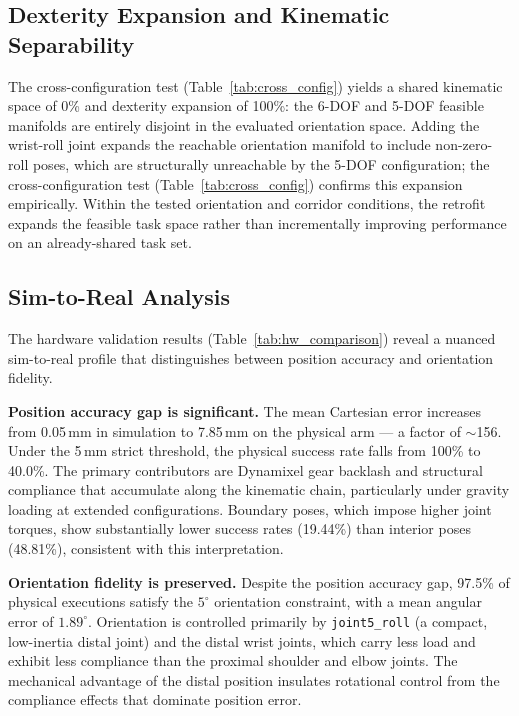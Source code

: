 \documentclass[conference]{IEEEtran}
\begin{document}
	\subsection{Dexterity Expansion and Kinematic Separability}
	
	The cross-configuration test (Table~\ref{tab:cross_config}) yields a
	shared kinematic space of 0\% and dexterity expansion of 100\%: the
	6-DOF and 5-DOF feasible manifolds are entirely disjoint in the
	evaluated orientation space. Adding the wrist-roll joint expands the
	reachable orientation manifold to include non-zero-roll poses, which
	are structurally unreachable by the 5-DOF configuration; the
	cross-configuration test (Table~\ref{tab:cross_config}) confirms this
	expansion empirically. Within the tested orientation and corridor
	conditions, the retrofit expands the feasible task space rather than
	incrementally improving performance on an already-shared task set.
	
	\subsection{Sim-to-Real Analysis}
	\label{sec:sim_to_real}
	
	The hardware validation results (Table~\ref{tab:hw_comparison}) reveal
	a nuanced sim-to-real profile that distinguishes between position
	accuracy and orientation fidelity.
	
	\textbf{Position accuracy gap is significant.}
	The mean Cartesian error increases from 0.05\,mm in simulation to
	7.85\,mm on the physical arm --- a factor of $\sim$156. Under the
	5\,mm strict threshold, the physical success rate falls from 100\% to
	40.0\%. The primary contributors are Dynamixel gear backlash and
	structural compliance that accumulate along the kinematic chain,
	particularly under gravity loading at extended configurations.
	Boundary poses, which impose higher joint torques, show substantially
	lower success rates (19.44\%) than interior poses (48.81\%),
	consistent with this interpretation.
	
	\textbf{Orientation fidelity is preserved.}
	Despite the position accuracy gap, 97.5\% of physical executions
	satisfy the $5^\circ$ orientation constraint, with a mean angular
	error of $1.89^\circ$. Orientation is controlled primarily by
	\texttt{joint5\_roll} (a compact, low-inertia distal joint) and the
	distal wrist joints, which carry less load and exhibit less compliance
	than the proximal shoulder and elbow joints. The mechanical advantage
	of the distal position insulates rotational control from the compliance
	effects that dominate position error.
	
\end{document}
